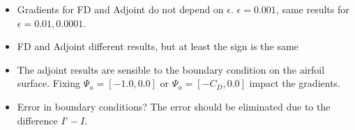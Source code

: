 \begin{frame}
    \begin{itemize}
        \item Gradients for FD and Adjoint do not depend on $\epsilon$. $\epsilon=0.001$, same results for $\epsilon=0.01,0.0001$.
        \item FD and Adjoint different results, but at least the sign is the same
        \item The adjoint results are sensible to the boundary condition on the airfoil surface. Fixing $\Psi_u = [-1.0, 0.0]$ or $\Psi_u = [-C_D, 0.0]$ impact the gradients.
        \item Error in boundary conditions? The error should be eliminated due to the difference $I'-I$.
    \end{itemize}
\end{frame}